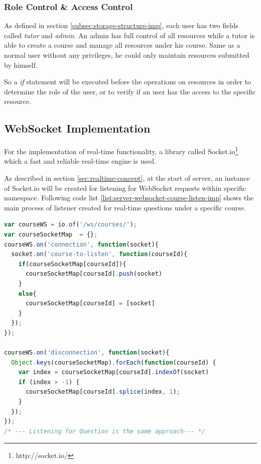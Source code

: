 \subsubsection{Role Control \& Access Control}
As defined in section \ref{subsec:storage-structure-imp}, each user has two fields called \textit{tutor} and \textit{admin}. An admin has full control of all resources while a tutor  is able to create a course and manage all resources under his course. Same as a normal user without any privileges, he could only maintain resources submitted by himself.

So a \textit{if} statement will be executed before the operations on resources in order to determine the role of the user, or to verify if an user has the access to the specific resource.




\subsection{WebSocket Implementation}
For the implementation of real-time functionality, a library called Socket.io\footnote{http://socket.io/} which a fast and reliable real-time engine is used. 

As described in section \ref{sec:realtime-concept}, at the start of server, an instance of Socket.io will be created for listening for WebSocket requests within specific namespace. Following code list \ref{list:server-websocket-course-listen-imp} shows the main process of listener created for real-time questions under a specific course.

\begin{lstlisting}[language=JavaScript, caption=Server starts listening for requests over WebSocket protocol , label={list:server-websocket-course-listen-imp}]
var courseWS = io.of('/ws/courses/');
var courseSocketMap  = {};
courseWS.on('connection', function(socket){
  socket.on('course-to-listen', function(courseId){
    if(courseSocketMap[courseId]){
      courseSocketMap[courseId].push(socket)
    }
    else{
      courseSocketMap[courseId] = [socket]
    }
  });
});

courseWS.on('disconnection', function(socket){
  Object.keys(courseSocketMap).forEach(function(courseId) {
    var index = courseSocketMap[courseId].indexOf(socket)
    if (index > -1) {
      courseSocketMap[courseId].splice(index, 1);
    }
  });
});
/* --- Listening for Question is the same approach--- */
\end{lstlisting}

